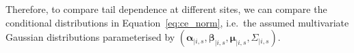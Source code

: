 \documentclass[
  12pt]{article}
\DeclareMathOperator{\CE}{\mathrm{CE}}
\begin{document}
Therefore, to compare tail dependence at different sites, we can compare the conditional distributions in Equation~\eqref{eq:ce_norm}, i.e.\ the assumed multivariate Gaussian distributions parameterised by $(\symbf{\alpha}_{\mid i, s},\symbf{\beta}_{\mid i, s},\symbf{\mu}_{\mid i, s},\Sigma_{\mid i, s})$. %
\end{document}
